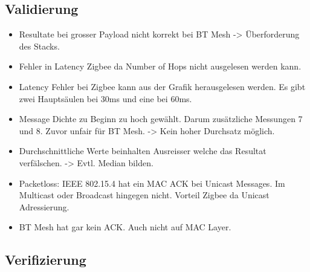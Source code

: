 \subsection{Validierung}\label{subsec:Validierung}



\begin{itemize}
\item Resultate bei grosser Payload nicht korrekt bei BT Mesh -> Überforderung des Stacks.

\item Fehler in Latency Zigbee da Number of Hops nicht ausgelesen werden kann.

\item Latency Fehler bei Zigbee kann aus der Grafik herausgelesen werden. Es gibt zwei Hauptsäulen bei 30ms und eine bei 60ms.

\item Message Dichte zu Beginn zu hoch gewählt. Darum zusätzliche Messungen 7 und 8. Zuvor unfair für BT Mesh. -> Kein hoher Durchsatz möglich.

\item Durchschnittliche Werte beinhalten Ausreisser welche das Resultat verfälschen. -> Evtl. Median bilden.

\item Packetloss: IEEE 802.15.4 hat ein MAC ACK bei Unicast Messages. Im Multicast oder Broadcast hingegen nicht. Vorteil Zigbee da Unicast Adressierung.

\item BT Mesh hat gar kein ACK. Auch nicht auf MAC Layer.

\end{itemize}

\subsection{Verifizierung}\label{subsec:Verifizierung}





